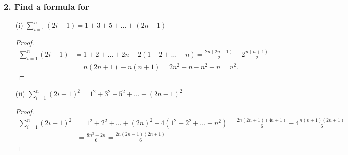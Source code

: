 \documentclass{article}
\begin{document}
\subsubsection*{2. Find a formula for}
\begin{enumerate}
	\item[(i)] $\sum^{n}_{i = 1}(2i - 1) = 1 + 3 + 5 + \dots + (2n - 1)$
	\begin{proof}
		\begin{align*}
			\sum^{n}_{i = 1}(2i - 1) &= 1 + 2 + \dots + 2n - 2(1 + 2 + \dots + n) = \frac{2n(2n + 1)}{2} - 2\frac{n(n+1)}{2} \\&= n(2n + 1) - n(n + 1) = 2n^2 + n - n^2 - n = n^2.
		\end{align*}
	\end{proof}
	\pagebreak
	\item[(ii)] $\sum^{n}_{i = 1}(2i - 1)^2 = 1^2 + 3^2 + 5^2 + \dots + (2n - 1)^2$
	\begin{proof}
		\begin{align*}
			\sum^{n}_{i = 1}(2i - 1)^2 &= 1^2 + 2^2 + \dots + (2n)^2 - 4(1^2 + 2^2 + \dots + n^2) = \frac{2n(2n + 1)(4n + 1)}{6} - 4\frac{n(n+1)(2n+1)}{6} \\&= \frac{8n^3 - 2n}{6} = \frac{2n(2n - 1)(2n + 1)}{6}
		\end{align*}
	\end{proof}
\end{enumerate}
\end{document}
